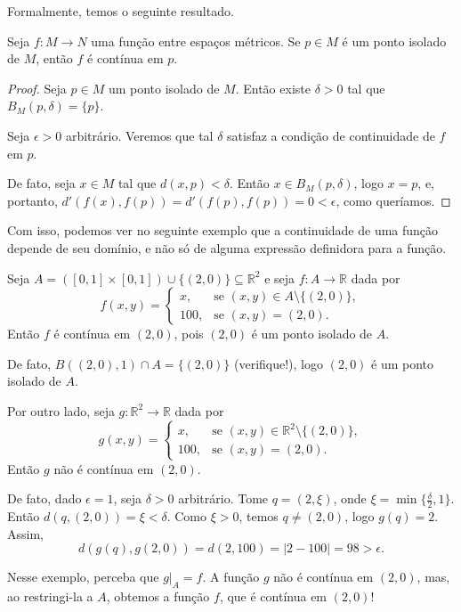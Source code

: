 Formalmente, temos o seguinte resultado.
\begin{proposition}
    Seja $f:M\rightarrow N$ uma função entre espaços métricos.
    Se $p\in M$ é um ponto isolado de $M$, então $f$ é contínua em $p$.
\end{proposition}
\begin{proof}
    Seja $p\in M$ um ponto isolado de $M$.
    Então existe $\delta>0$ tal que $B_M(p, \delta) = \{p\}$.

    Seja $\epsilon>0$ arbitrário.
    Veremos que tal $\delta$ satisfaz a condição de continuidade de $f$ em $p$.

    De fato, seja $x \in M$ tal que $d(x, p) < \delta$.
    Então $x \in B_M(p, \delta)$, logo $x = p$, e, portanto, $d'(f(x), f(p)) = d'(f(p), f(p)) = 0 < \epsilon$, como queríamos.
\end{proof}

Com isso, podemos ver no seguinte exemplo que a continuidade de uma função depende de seu domínio, e não só de alguma expressão definidora para a função.

\begin{example}\label{ex:restricaoContinuidade}
    Seja $A=([0, 1]\times[0, 1])\cup \{(2, 0)\}\subseteq \mathbb R^2$ e seja $f: A\rightarrow \mathbb R$ dada por
    \[
        f(x, y) = \begin{cases}
            x, & \text{se } (x, y) \in A\setminus\{(2, 0)\}, \\
            100, & \text{se } (x, y) = (2, 0).
        \end{cases}
    \]
    Então $f$ é contínua em $(2, 0)$, pois $(2, 0)$ é um ponto isolado de $A$.
    
    De fato, $B((2, 0), 1) \cap A = \{(2, 0)\}$ (verifique!), logo $(2, 0)$ é um ponto isolado de $A$.

    Por outro lado, seja $g: \mathbb R^2\rightarrow \mathbb R$ dada por
    \[
        g(x, y) = \begin{cases}
            x, & \text{se } (x, y) \in \mathbb R^2\setminus\{(2, 0)\}, \\
            100, & \text{se } (x, y) = (2, 0).
        \end{cases}
    \]
    Então $g$ não é contínua em $(2, 0)$.

    De fato, dado $\epsilon = 1$, seja $\delta>0$ arbitrário.
    Tome $q = (2, \xi)$, onde $\xi = \min\{\frac{\delta}{2}, 1\}$.
    Então $d(q, (2, 0)) = \xi < \delta$.
    Como $\xi>0$, temos $q\neq (2,0)$, logo $g(q)=2$.
    Assim,
    \[
        d(g(q), g(2, 0)) = d(2, 100) = |2 - 100| = 98 > \epsilon.
    \]

    Nesse exemplo, perceba que $g|_{A} = f$.
    A função $g$ não é contínua em $(2, 0)$, mas, ao restringi-la a $A$, obtemos a função $f$, que é contínua em $(2, 0)$!
\end{example}

